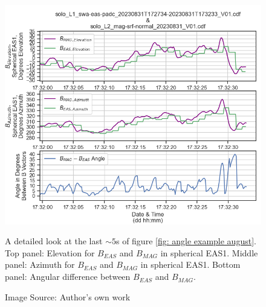 \begin{figure}[h!]
    \centering
    \centerfloat
    \includegraphics[width=1.05\linewidth]{figures/Angle Example Detail.png}
    \caption{A detailed look at the last \(\sim5\)s of figure \ref{fig: angle example august}. Top panel: Elevation for \(B_{EAS}\) and \(B_{MAG}\) in spherical EAS1. Middle panel: Azimuth for \(B_{EAS}\) and \(B_{MAG}\) in spherical EAS1. Bottom panel: Angular difference between \(B_{EAS}\) and \(B_{MAG}\).}
    \caption*{Image Source: Author's own work}
    \label{fig: angle example detail august}
\end{figure}

